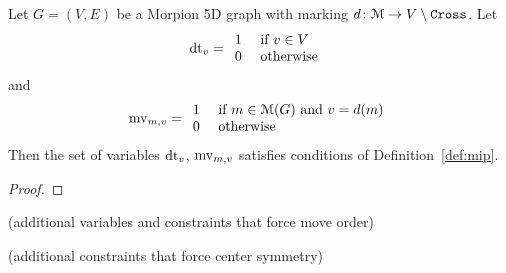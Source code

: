 \begin{lemma}
  Let $G = (V, E)$ be a Morpion 5D graph with marking $d \colon \mathcal{M} \to V \setminus \texttt{Cross}$.
  Let
  \[
    \operatorname{dt}_v = \begin{array}{ll}
      1 & \text{ if } v \in V \\
      0 & \text{ otherwise }
    \end{array}
  \]
  and 
  \[
    \operatorname{mv}_{m, v} = \begin{array}{ll}
      1 & \text{ if } m \in \mathcal{M}(G) \text{ and } v = d(m) \\
      0 & \text{ otherwise }
    \end{array}
  \]
  Then the set of variables $\operatorname{dt}_v$, $\operatorname{mv}_{m, v}$ satisfies conditions of Definition~\ref{def:mip}.
\end{lemma}
\begin{proof}
\end{proof}

\begin{definition}
(additional variables and constraints that force move order)

(additional constraints that force center symmetry)
\end{definition}

\begin{lemma}
  
\end{lemma}
